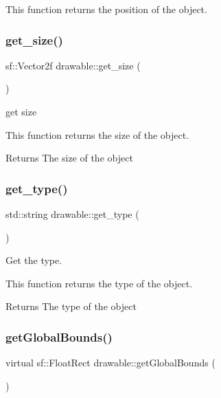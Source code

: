This function returns the position of the object. \mbox{\label{classdrawable_a58cb3ab0406d40e9cea3aefac1e4bf05}} 
\subsubsection{\texorpdfstring{get\+\_\+size()}{get\_size()}}
{\footnotesize\ttfamily sf\+::\+Vector2f drawable\+::get\+\_\+size (\begin{DoxyParamCaption}{ }\end{DoxyParamCaption})\hspace{0.3cm}{\ttfamily [virtual]}}



get size 

This function returns the size of the object.

\begin{DoxyReturn}{Returns}
The size of the object 
\end{DoxyReturn}
\mbox{\label{classdrawable_a329e564296d591dc8bd2f6dc5a205213}} 
\subsubsection{\texorpdfstring{get\+\_\+type()}{get\_type()}}
{\footnotesize\ttfamily std\+::string drawable\+::get\+\_\+type (\begin{DoxyParamCaption}{ }\end{DoxyParamCaption})}



Get the type. 

This function returns the type of the object.

\begin{DoxyReturn}{Returns}
The type of the object 
\end{DoxyReturn}
\mbox{\label{classdrawable_ae013ac0be47538be9ce885d6642daf73}} 
\subsubsection{\texorpdfstring{get\+Global\+Bounds()}{getGlobalBounds()}}
{\footnotesize\ttfamily virtual sf\+::\+Float\+Rect drawable\+::get\+Global\+Bounds (\begin{DoxyParamCaption}{ }\end{DoxyParamCaption})\hspace{0.3cm}{\ttfamily [pure virtual]}}



